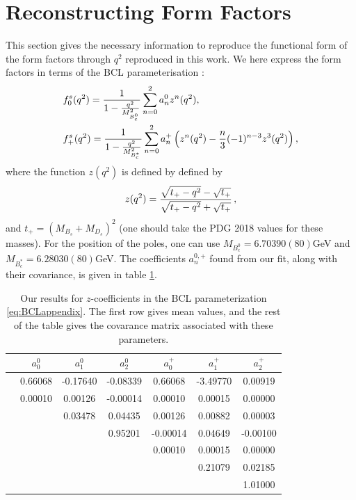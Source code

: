 \FloatBarrier

\section{Reconstructing Form Factors}
\label{sec:reconstructing_formfactors}

This section gives the necessary information to reproduce the functional form of the form factors through $q^2$ reproduced in this work. We here express the form factors in terms of the BCL parameterisation \cite{Bourrely:2008za}:
\begin{align}
  \label{eq:BCLappendix}
  &f^s_0(q^2) = {1\over 1 - {q^2\over M_{B_c^0}^2} } \sum_{n=0}^{2} a_n^0 z^n(q^2), \\
  \nonumber
  &f^s_+(q^2) = {1\over 1 - {q^2\over M_{B_c^*}^2} } \sum_{n=0}^{2} a_n^+ \left( z^n(q^2) - {n\over 3} (-1)^{n-3} z^3(q^2) \right), \nonumber
\end{align}
where the function $z(q^2)$ is defined by defined by
\begin{align}
  z(q^2) = {\sqrt{t_+ - q^2} - \sqrt{t_+} \over \sqrt{t_+ - q^2} + \sqrt{t_+} }\,,
\end{align}
and $t_+ = (M_{B_s}+M_{D_s})^2$ (one should take the PDG 2018 values for these masses). For the position of the poles, one can use $M_{B_c^0} = 6.70390(80)$GeV and $M_{B_c^*} = 6.28030(80)$GeV. The coefficients $a_n^{0,+}$ found from our fit, along with their covariance, is given in table \ref{tab:coeffs}.

\begin{table}[htb!]
\begin{center}
\begin{tabular}{ c c c c c c c }
\hline
 & $a^0_0$ & $a^0_1$ & $a^0_2$ & $a^+_0$ & $a^+_1$ & $a^+_2$\\ [0.5ex]
\hline
 & 0.66068 & -0.17640 & -0.08339 & 0.66068 & -3.49770 & 0.00919\\ [1ex]
\hline
 & 0.00010 & 0.00126 & -0.00014 & 0.00010 & 0.00015 & 0.00000\\ [1ex]
 &  & 0.03478 & 0.04435 & 0.00126 & 0.00882 & 0.00003\\ [1ex]
 &  &  & 0.95201 & -0.00014 & 0.04649 & -0.00100\\ [1ex]
 &  &  &  & 0.00010 & 0.00015 & 0.00000\\ [1ex]
 &  &  &  &  & 0.21079 & 0.02185\\ [1ex]
 &  &  &  &  &  & 1.01000\\ [1ex]
\hline
\end{tabular}
    \caption{Our results for $z$-coefficients in the BCL parameterization \eqref{eq:BCLappendix}. The first row gives mean values, and the rest of the table gives the covarance matrix associated with these parameters. \label{tab:coeffs}}
\end{center}
\end{table}



